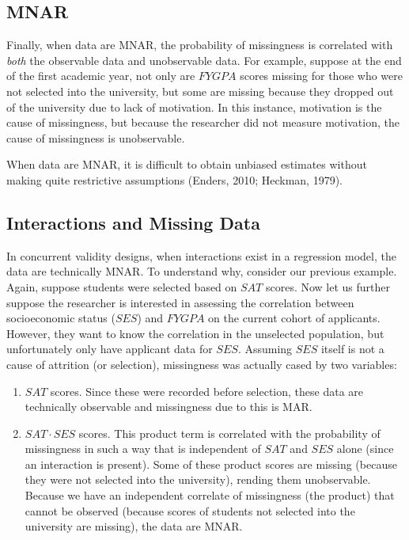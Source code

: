 \documentclass[english,man]{apa6}
\providecommand{\tightlist}{%
  \setlength{\itemsep}{0pt}\setlength{\parskip}{0pt}}
\theoremstyle{definition}
\theoremstyle{definition}
\theoremstyle{remark}
\begin{document}
\subsection{MNAR}\label{mnar}

Finally, when data are MNAR, the probability of missingness is
correlated with \emph{both} the observable data and unobservable data.
For example, suppose at the end of the first academic year, not only are
\(FYGPA\) scores missing for those who were not selected into the
university, but some are missing because they dropped out of the
university due to lack of motivation. In this instance, motivation is
the cause of missingness, but because the researcher did not measure
motivation, the cause of missingness is unobservable.

When data are MNAR, it is difficult to obtain unbiased estimates without
making quite restrictive assumptions (Enders, 2010; Heckman, 1979).

\subsection{Interactions and Missing
Data}\label{interactions-and-missing-data}

In concurrent validity designs, when interactions exist in a regression
model, the data are technically MNAR. To understand why, consider our
previous example. Again, suppose students were selected based on \(SAT\)
scores. Now let us further suppose the researcher is interested in
assessing the correlation between socioeconomic status (\(SES\)) and
\(FYGPA\) on the current cohort of applicants. However, they want to
know the correlation in the unselected population, but unfortunately
only have applicant data for \(SES\). Assuming \(SES\) itself is not a
cause of attrition (or selection), missingness was actually cased by two
variables:

\begin{enumerate}
\def\labelenumi{(\arabic{enumi})}
\tightlist
\item
  \(SAT\) scores. Since these were recorded before selection, these data
  are technically observable and missingness due to this is MAR.
\item
  \(SAT\cdot SES\) scores. This product term is correlated with the
  probability of missingness in such a way that is independent of
  \(SAT\) and \(SES\) alone (since an interaction is present). Some of
  these product scores are missing (because they were not selected into
  the university), rending them unobservable. Because we have an
  independent correlate of missingness (the product) that cannot be
  observed (because scores of students not selected into the university
  are missing), the data are MNAR.
\end{enumerate}
\end{document}
